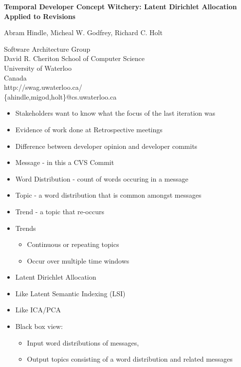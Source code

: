 \documentclass[titlepage,usenames,a4,landscape,semhelv]{seminar}
\author{
\names \\ 
{\small Software Architecture Group }\\
\small David R. Cheriton School of Computer Science\\
\small University of Waterloo\\
\small Canada\\
ahindle@cs.uwaterloo.ca
}
\newcommand{\gettitle}{Temporal Developer Concept Witchery: Latent Dirichlet Allocation Applied to Revisions}
\newcommand{\gettitleproper}{\gettitle}
\newcommand{\names}{Abram Hindle, Micheal W. Godfrey, Richard C. Holt}
\begin{document}
\pagestyle{fancy} %
\begin{slide}

\begin{center}
{\bf \LARGE \gettitleproper }

{\names } 

{\small Software Architecture Group }\\[-.5em]
{\small David R. Cheriton School of Computer Science}\\[-.5em]
{\small University of Waterloo}\\[-.5em]
{\small Canada}\\[-.5em]
{\small http://swag.uwaterloo.ca/}\\
\{ahindle,migod,holt\}@cs.uwaterloo.ca


\end{center}

\begin{itemize}
\item Stakeholders want to know what the focus of the last iteration was
\item Evidence of work done at Retrospective meetings
\item Difference between developer opinion and developer commits


\end{itemize}
\begin{itemize}
\item Message - in this a CVS Commit
\item Word Distribution - count of words occuring in a message
\item Topic - a word distribution that is common amongst messages
\item Trend - a topic that re-occurs


\end{itemize}
\begin{itemize}
\item Trends
	\begin{itemize}
	\item Continuous or repeating topics
	\item Occur over multiple time windows

\end{itemize}
\end{itemize}
\begin{itemize}
\item Latent Dirichlet Allocation
\item Like Latent Semantic Indexing (LSI)
\item Like ICA/PCA
\item Black box view:
	\begin{itemize}
	\item Input word distributions of messages, 
	\item Output topics consisting of a word distribution and related messages




\end{itemize}
\end{itemize}
\end{slide}
\end{document}
